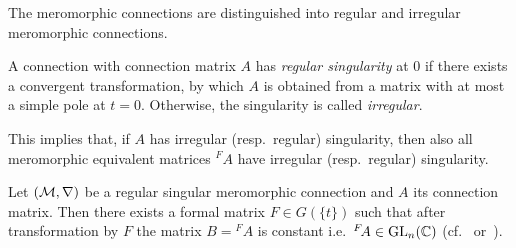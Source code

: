 The meromorphic connections are distinguished into regular and irregular
meromorphic connections.
\begin{defn}
  A connection with connection matrix $A$ has \emph{regular singularity} at $0$
  if there exists a convergent transformation, by which $A$ is obtained from a
  matrix with at most a simple pole at $t=0$.
  Otherwise, the singularity is called \emph{irregular}.
  \begin{s-rem}
    This implies that, if $A$ has irregular (resp.\ regular) singularity, then
    also all meromorphic equivalent matrices ${}^{F}\!A$ have irregular
    (resp.\ regular) singularity.
  \end{s-rem}
\end{defn}
\begin{thm}\label{thm:regularConnConstMat}
  Let $(\mathcal{M},\nabla)$ be a regular singular meromorphic connection and $A$ its
  connection matrix.
  Then there exists a formal matrix $F\in G(\!\{t\}\!)$ such that after
  transformation by $F$ the matrix $B={}^F\!A$ is constant i.e.\
  ${}^F\!A\in\operatorname{GL}_n(\mathbb{C})$ (cf.~\cite[Thm.II.2.8]{sabbah2007isomonodromic}
  or~\cite[Sec.5.1.2]{hotta2008}).
\end{thm}

